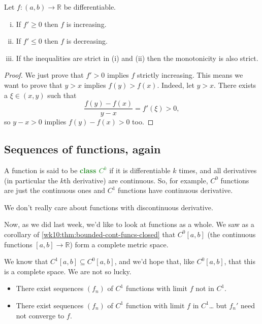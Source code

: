 \documentclass[10pt]{scrartcl}
\providecommand{\RR}{\mathbb R}
\providecommand{\ii}{\item}
\providecommand{\vocab}[1]{{\textbf{\textcolor{ForestGreen}{#1}}}}
\begin{document}
\begin{corollary}
	Let $f\colon(a,b)\to\RR$ be differentiable.
	\begin{enumerate}[(i)]
		\ii If $f' \ge 0$ then $f$ is increasing.
		\ii If $f' \le 0$ then $f$ is decreasing.
		\ii If the inequalities are strict in (i) and (ii)
		then the monotonicity is also strict.
	\end{enumerate}
\end{corollary}

\begin{proof}
	We just prove that $f' > 0$ implies $f$ strictly increasing.
	This means we want to prove that $y > x$ implies $f(y) > f(x)$.
	Indeed, let $y > x$. There exists a $\xi\in(x, y)$ such that
	\[\frac{f(y) - f(x)}{y - x} = f'(\xi) > 0,\]
	so $y -x > 0$ implies $f(y) - f(x) > 0$ too.
\end{proof}

\subsection{Sequences of functions, again}

\begin{definition}[$C^k$ functions]\label{wk11:def:Ck-funcs}
	A function is said to be \vocab{class $C^k$}
	if it is differentiable $k$ times,
	and all derivatives (in particular the $k$th derivative) are continuous.
	So, for example, $C^0$ functions are just the continuous ones
	and $C^1$ functions have continuous derivative.
\end{definition}

\begin{remark}
	We don't really care about functions with discontinuous derivative.
\end{remark}

Now, as we did last week, we'd like to look at functions as a whole.
We saw as a corollary of \ref{wk10:thm:bounded-cont-funcs-closed}
that $C^0[a,b]$ (the continuous functions $[a,b]\to\RR$) form
a complete metric space.

We know that $C^1[a,b]\subseteq C^0[a,b]$,
and we'd hope that, like $C^0[a,b]$, that this is a complete space.
We are not so lucky.
\begin{itemize}
	\ii There exist sequences $(f_n)$ of $C^1$ functions
	with limit $f$ not in $C^1$.
	\ii There exist sequences $(f_n)$ of $C^1$ function
	 with limit $f$ in $C^1$\dots
	 but $f_n'$ need not converge to $f$.
\end{itemize}
\end{document}
